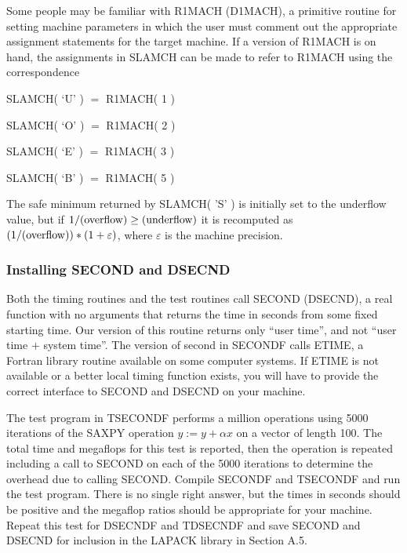 Some people may be familiar with R1MACH (D1MACH), a primitive
routine for setting machine parameters in which the user must
comment out the appropriate assignment statements for the target
machine.  If a version of R1MACH is on hand, the assignments in
SLAMCH can be made to refer to R1MACH using the correspondence

\begin{list}{}{}
\item {SLAMCH( `U' )}  $=$ R1MACH( 1 )
\item {SLAMCH( `O' )}  $=$ R1MACH( 2 )
\item {SLAMCH( `E' )}  $=$ R1MACH( 3 )
\item {SLAMCH( `B' )}  $=$ R1MACH( 5 )
\end{list}

\noindent
The safe minimum returned by SLAMCH( 'S' ) is initially set to the
underflow value, but if $1/({\rm overflow}) \geq ({\rm underflow})$
it is recomputed as $(1/({\rm overflow})) * ( 1 + \varepsilon )$,
where $\varepsilon$ is the machine precision.

\subsubsection{Installing SECOND and DSECND}
\dent
Both the timing routines and the test routines call SECOND
(DSECND), a real function with no arguments that returns the time
in seconds from some fixed starting time.
Our version of this routine returns only ``user time'', and
not ``user time $+$ system time''. 
The version of second in SECONDF calls ETIME, a Fortran library
routine available on some computer systems.
If ETIME is not available or a better local timing function exists, 
you will have to provide the correct interface to SECOND and DSECND 
on your machine. 

The test program in TSECONDF
performs a million operations using 5000 iterations of 
the SAXPY operation $y := y + \alpha x$ on a vector of length 100.
The total time and megaflops for this test is reported, then
the operation is repeated including a call to SECOND on each of
the 5000 iterations to determine the overhead due to calling SECOND.
Compile SECONDF and TSECONDF and run the test program.
There is no single right answer, but the times
in seconds should be positive and the megaflop ratios should be 
appropriate for your machine.
Repeat this test for DSECNDF and TDSECNDF and
save SECOND and DSECND for inclusion in the LAPACK library in 
Section A.5.

